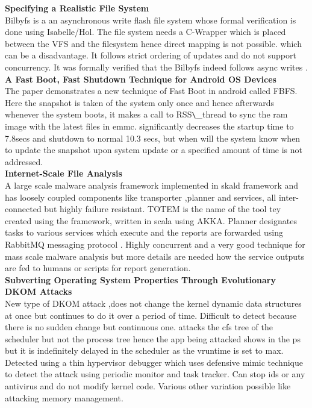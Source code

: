 \textbf{Specifying a Realistic File System }\\
 Bilbyfs \cite{amani2015specifying}   is a an asynchronous write flash file system whose formal verification is done using Isabelle/Hol. The file system needs a C-Wrapper which is placed between the VFS and the filesystem hence direct mapping is not possible. which can be a disadvantage. It follows strict ordering of updates and do not support concurrency. It was formally verified that the Bilbyfs indeed follows async writes .\\

\textbf{A Fast Boot, Fast Shutdown Technique for Android OS Devices}\\
The paper \cite{yang2016} demonstrates a new technique of Fast Boot in android called FBFS. Here the snapshot is taken of the system only once and hence afterwards whenever the system boots, it makes a call to RSS\verb+\+\_thread to sync the ram image with the latest files in emmc. significantly decreases the startup time to 7.8secs and shutdown to normal 10.3 secs, but when will the system know when to update the snapshot upon system update or a specified amount of time is not addressed.\\

\textbf{Internet-Scale File Analysis}\\
A \cite{hanif2015} large scale malware analysis framework implemented in skald framework and has loosely coupled components like transporter ,planner and services, all inter-connected but highly failure resistant. TOTEM is the name of the tool tey created using the framework, written in scala using AKKA. Planner designates tasks to various services which execute and the reports are forwarded using RabbitMQ messaging protocol . Highly concurrent and a very good technique for mass scale malware analysis but more details are needed how the service outputs are fed to humans or scripts for report generation.\\


\textbf{Subverting Operating System Properties Through Evolutionary DKOM Attacks}\\
 New type \cite{graziano2016} of DKOM attack ,does not change the kernel dynamic data structures at once but continues to do it over a period of time. Difficult to detect because there is no sudden change but continuous one. attacks the cfs tree of the scheduler but not the process tree hence the app being attacked shows in the ps but it is indefinitely delayed in the scheduler as the vruntime is set to max. Detected using a thin hypervisor debugger which uses defensive mimic technique to detect the attack using periodic monitor and task tracker. Can stop ids or any antivirus and do not modify kernel code. Various other variation possible like attacking memory management.\\

